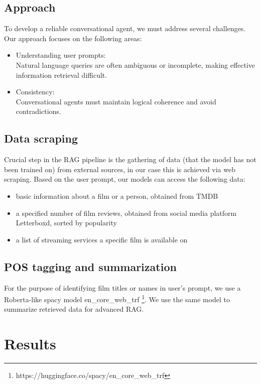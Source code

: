 \documentclass[fleqn,moreauthors,10pt]{ds_report}
\begin{document}
\subsection*{Approach}
To develop a reliable conversational agent, we must address several challenges.
Our approach focuses on the following areas:
\begin{itemize}
\item Understanding user prompts:\\
Natural language queries are often ambiguous or incomplete, making effective information retrieval difficult.
\item Consistency:\\
Conversational agents must maintain logical coherence and avoid contradictions.


\end{itemize}


\subsection*{Data scraping}

Crucial step in the RAG pipeline is the gathering of data (that the model has not been trained on) from external sources, in our case this is achieved via web scraping. Based on the user prompt, our models can access the following data:
\begin{itemize}
	\item basic information about a film or a person, obtained from TMDB
	\item a specified number of film reviews, obtained from social media platform Letterboxd, sorted by popularity
	\item a list of streaming services a specific film is available on
\end{itemize}

\subsection*{POS tagging and summarization}

For the purpose of identifying film titles or names in user's prompt, we use a Roberta-like spacy model en\_core\_web\_trf \footnote{https://huggingface.co/spacy/en\_core\_web\_trf}. We use the same model to summarize retrieved data for advanced RAG.  



\section*{Results}
\end{document}
